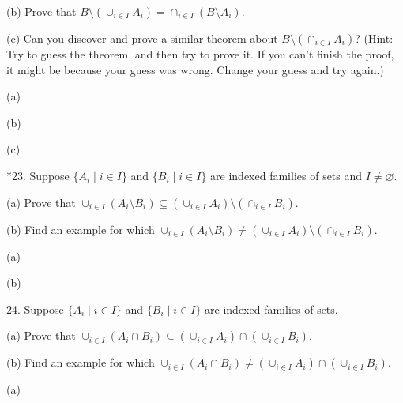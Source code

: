 \documentclass{article}
\begin{document}
\hspace{12pt}(b) Prove that $B \setminus (\cup_{i \in I} A_i) = \cap_{i \in I} (B \setminus A_i)$.

\hspace{12pt}(c) Can you discover and prove a similar theorem about $B \setminus (\cap_{i \in I} A_i)$?
(Hint: Try to guess the theorem, and then try to prove it. If you can't
finish the proof, it might be because your guess was wrong. Change
your guess and try again.)
\vspace{30pt}

(a)

\vspace{30pt}

(b)

\vspace{30pt}

(c)

\vspace{30pt}

*23. Suppose $\{A_i \mid i \in I\}$ and $\{B_i \mid i \in I\}$ are indexed families of sets and
$I \neq \varnothing$.

\hspace{12pt}(a) Prove that $\cup_{i \in I} (A_i \setminus B_i) \subseteq (\cup_{i \in I} A_i) \setminus (\cap_{i \in I} B_i)$.

\hspace{12pt}(b) Find an example for which $\cup_{i \in I} (A_i \setminus B_i) \neq (\cup_{i \in I} A_i) \setminus (\cap_{i \in I} B_i)$.
\vspace{30pt}

(a)

\vspace{30pt}

(b)

\vspace{30pt}

24. Suppose $\{A_i \mid i \in I\}$ and $\{B_i \mid i \in I\}$ are indexed families of sets.

\hspace{12pt}(a) Prove that $\cup_{i \in I} (A_i \cap B_i) \subseteq (\cup_{i \in I} A_i) \cap (\cup_{i \in I} B_i)$.

\hspace{12pt}(b) Find an example for which $\cup_{i \in I} (A_i \cap B_i) \neq (\cup_{i \in I} A_i) \cap (\cup_{i \in I} B_i)$.
\vspace{30pt}

(a)

\vspace{30pt}
\end{document}
